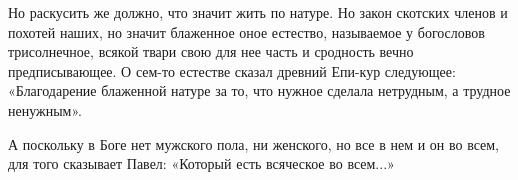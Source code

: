 Но раскусить же должно, что значит жить по натуре. Но закон скотских членов и
похотей наших, но значит блаженное оное естество, называемое у богословов
трисолнечное, всякой твари свою для нее часть и сродность вечно предписывающее.
О сем-то естестве сказал древний Епи-кур следующее: «Благодарение блаженной
натуре за то, что нужное сделала нетрудным, а трудное ненужным».

А поскольку в Боге нет мужского пола, ни женского, но все в нем и он во всем,
для того сказывает Павел: «Который есть всяческое во всем...» 

